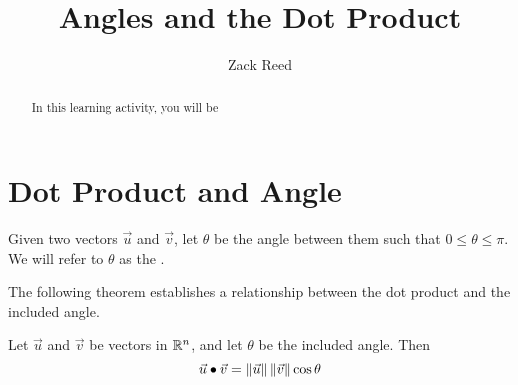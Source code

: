 \documentclass{ximera}
\author{Zack Reed}
\title{Angles and the Dot Product}
\begin{document}
\begin{abstract}

    In this learning activity, you will be 
\end{abstract}
\maketitle

\section*{Dot Product and Angle}
 
Given two vectors $\vec{u}$ and $\vec{v}$, let $\theta$ be the angle between them such that $0\leq\theta\leq \pi$.  We will refer to $\theta$ as the .
 
\begin{center}
\end{center}
 
The following theorem establishes a relationship between the dot product and the included angle.
 
  \begin{theorem}\label{th:dotproductcosine} Let $\vec{u}$ and $\vec{v}$ be vectors in $\mathbb{R}^n$, and let $\theta$ be the included angle.  Then
  \begin{equation*} \label{matlintrans}
 \vec{u}\bullet\vec{v}=\left\|\vec{u}\right\|\left\|\vec{v}\right\|\cos \theta
\end{equation*}
\end{theorem}
 
\end{document}
